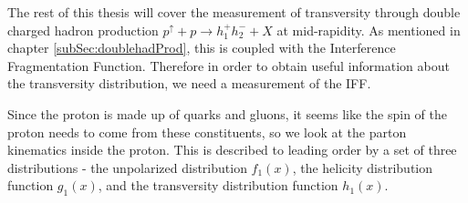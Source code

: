 \documentclass[letterpaper, abstract = on,listof=totoc, bibliography=totoc]{scrreprt}
\begin{document}
The rest of this thesis will cover the measurement of transversity through double charged hadron production $p^\uparrow + p \rightarrow h_1^+h_2^- + X$ at mid-rapidity. As mentioned in chapter \ref{subSec:doublehadProd}, this is coupled with the Interference Fragmentation Function. Therefore in order to obtain useful information about the transversity distribution, we need a measurement of the IFF. 

Since the proton is made up of quarks and gluons, it seems like the spin of the proton needs to come from these constituents, so we look at the parton kinematics inside the proton. This is described to leading order by a set of three distributions -  the unpolarized distribution $f_1(x)$, the helicity distribution function $g_1(x)$, and the transversity distribution function $h_1(x)$.            
%
%
%
\end{document}
